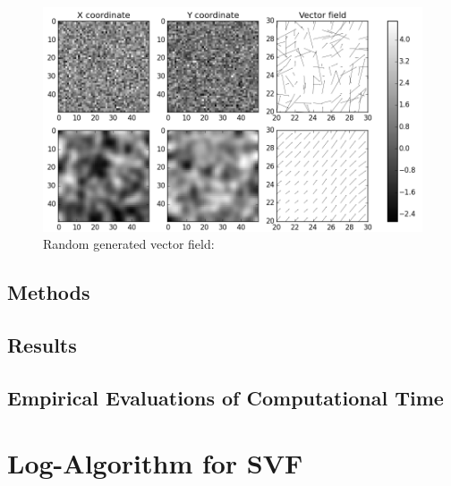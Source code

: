 \begin{figure}[!ht]
	\hspace{-1cm}
	\includegraphics[scale=0.75]{figures/gaussian_smoothing_effect.png}
	\caption{Random generated vector field: }
	\label{fig:svf_gaussian_smoothing_effects}
\end{figure}


\subsection{Methods}

\subsection{Results}

\subsection{Empirical Evaluations of Computational Time}

\section{Log-Algorithm for SVF}


